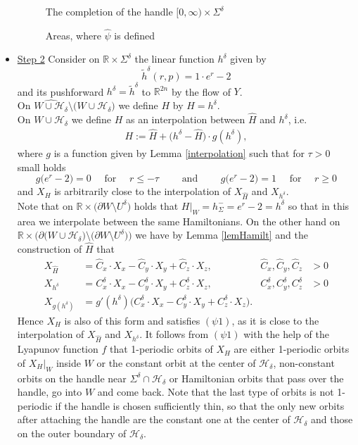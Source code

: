 \documentclass[a4paper,12pt,bibliography=totocnumbered,titlepage=false,abstracton,bookmarksnumbered=true]{scrartcl}
\theoremstyle{definition}
\begin{document}
\begin{itemize}
\begin{figure}[ht]
\begin{minipage}[ht]{7cm}
 \resizebox{7cm}{!}{}
 \caption*{The completion of the handle $[0,\infty)\times\Sigma^\delta$}
\end{minipage}
 \caption{\label{fig6}Areas, where $\hat{\psi}$ is defined}
\centering
\end{figure}
\item \underline{Step 2} Consider on $\mathbb{R}\times\Sigma^\delta$ the linear function $h^\delta$ given by
\[\tilde{h}^\delta(r,p)=1{\cdot} e^r-2\]
and its pushforward $h^\delta=\tilde{h}^\delta$ to $\mathbb{R}^{2n}$ by the flow of $Y$.\\
On $\widehat{W{\cup} \mathcal{H}_\delta}\setminus\big(W{\cup} \mathcal{H}_\delta\big)$ we define $H$ by $H=h^\delta$.\\
On $W{\cup} \mathcal{H}_\delta$ we define $H$ as an interpolation between $\widehat{H}$ and $h^\delta$, i.e.\
\begin{align*}H:=\hat{H}+\big(h^\delta-\hat{H}\big)\cdot g(h^\delta),
\end{align*}
where $g$ is a function given by Lemma \ref{interpolation} such that for $\tau>0$ small holds
\[g\big(e^r{-}2\big)= 0\quad \text{ for } \quad r\leq -\tau\qquad\text{ and }\qquad g\big(e^r{-}2\big) = 1\quad \text{ for } \quad r\geq 0\]
and $X_H$ is arbitrarily close to the interpolation of $X_{\hat{H}}$ and $X_{h^\delta}$.\\
Note that on $\mathbb{R}\times\big(\partial W{\setminus} U^\delta\big)$ holds that $H|_W=h_\Sigma^-=e^r{-}2=h^\delta$ so that in this area we interpolate between the same Hamiltonians. On the other hand on $\mathbb{R}\times\Big(\partial\big(W{\cup} \mathcal{H}_\delta\big)\setminus\big(\partial W{\setminus} U^\delta\big)\Big)$ we have by Lemma \ref{lemHamilt} and the construction of $\widehat{H}$ that
\begin{align*}
 X_{\hat{H}} &= \hat{C}_x{\cdot} X_x-\hat{C}_y{\cdot} X_y + \hat{C}_z{\cdot} X_z, & \hat{C}_x,\hat{C}_y,\hat{C}_z&>0\\
 X_{h^\delta} &= C_x^\delta{\cdot} X_x-C_y^\delta{\cdot} X_y + C_z^\delta{\cdot} X_z, & C_x^\delta,C_y^\delta,C_z^\delta&>0\\
 X_{g(h^\delta)}&=g'(h^\delta)\big(C_x^\delta{\cdot} X_x-C_y^\delta{\cdot} X_y + C_z^\delta{\cdot} X_z\big).
\end{align*}
Hence $X_H$ is also of this form and satisfies $(\psi1)$, as it is close to the interpolation of $X_{\hat{H}}$ and $X_{h^\delta}$. It follows from $(\psi1)$ with the help of the Lyapunov function $f$ that 1-periodic orbits of $X_H$ are either 1-periodic orbits of $X_H|_W$ inside $W$ or the constant orbit at the center of $\mathcal{H}_\delta$, non-constant orbits on the handle near $\Sigma^\delta\cap\mathcal{H}_\delta$ or Hamiltonian orbits that pass over the handle, go into $W$ and come back. Note that the last type of orbits is not 1-periodic if the handle is chosen sufficiently thin, so that the only new orbits after attaching the handle are the constant one at the center of $\mathcal{H}_\delta$ and those on the outer boundary of $\mathcal{H}_\delta$.
\end{itemize}
\end{document}
